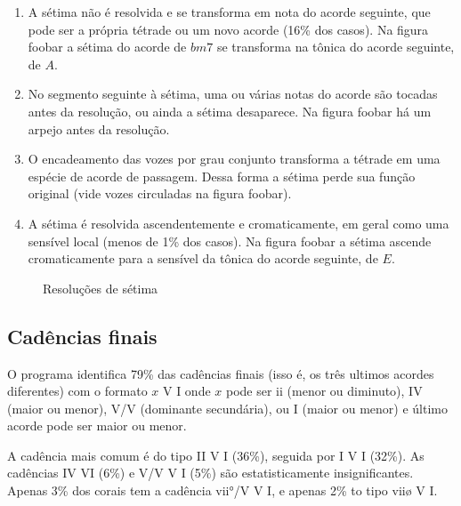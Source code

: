 \begin{enumerate}
\item A sétima não é resolvida e se transforma em nota do acorde
  seguinte, que pode ser a própria tétrade ou um novo acorde (16\% dos
  casos). Na figura foobar a sétima do acorde de $bm7$ se transforma
  na tônica do acorde seguinte, de $A$.
\item No segmento seguinte à sétima, uma ou várias notas do acorde são
  tocadas antes da resolução, ou ainda a sétima desaparece. Na figura
  foobar há um arpejo antes da resolução.
\item O encadeamento das vozes por grau conjunto transforma a tétrade
  em uma espécie de acorde de passagem. Dessa forma a sétima perde sua
  função original (vide vozes circuladas na figura foobar).
\item A sétima é resolvida ascendentemente e cromaticamente, em geral
  como uma sensível local (menos de 1\% dos casos). Na figura foobar a
  sétima ascende cromaticamente para a sensível da tônica do acorde
  seguinte, de $E$.
\end{enumerate}

\begin{figure}
  \centering
  \caption{Resoluções de sétima}
  \label{fig:setima-resol}
\end{figure}

\subsection{Cadências finais}
\label{sec:cadencias}

O programa identifica 79\% das cadências finais (isso é, os três
ultimos acordes diferentes) com o formato $x$ V I onde $x$ pode ser ii
(menor ou diminuto), IV (maior ou menor), V/V (dominante secundária),
ou I (maior ou menor) e último acorde pode ser maior ou menor.

A cadência mais comum é do tipo II V I (36\%), seguida por I V I
(32\%). As cadências IV VI (6\%) e V/V V I (5\%) são estatisticamente
insignificantes. Apenas 3\% dos corais tem a cadência vii°/V V I, e
apenas 2\% to tipo viiø V I.


